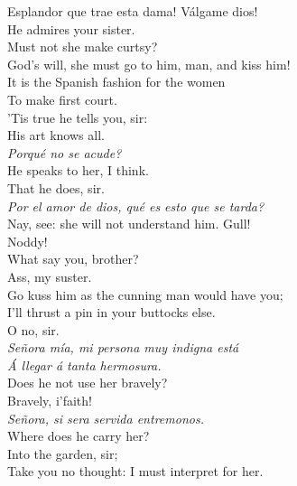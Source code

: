 \documentclass[a4paper,oneside,12pt]{memoir}
\begin{document}
\begin{drama*}
{Esplandor que trae esta dama! V\'{a}lgame dios!}\\
\facespeaks He admires your sister.\\
\kastrilspeaks {} Must not she make curtsy?\\
\subtlespeaks God's will, she must go to him, man, and kiss him!\\
It is the Spanish fashion for the women\\
To make first court.\\
\facespeaks {} 'Tis true he tells you, sir:\\
His art knows all.\\
\surlyspeaks {} \emph{Porqu\'{e} no se acude?}\\
\kastrilspeaks He speaks to her, I think.\\
\facespeaks {} That he does, sir.\\
\surlyspeaks \emph{Por el amor de dios, qu\'{e} es esto que se tarda?}\\
\kastrilspeaks Nay, see: she will not understand him. Gull!\\
Noddy!\\
\pliantspeaks {} What say you, brother?\\
\kastrilspeaks {} Ass, my suster.\\
Go kuss him as the cunning man would have you;\\
I'll thrust a pin in your buttocks else.\\
\facespeaks {} O no, sir.\\
\surlyspeaks \emph{Se\~{n}ora m\'{i}a, mi persona muy indigna est\'{a}\\
\'{A} llegar \'{a} tanta hermosura.}\\
\facespeaks Does he not use her bravely?\\
\kastrilspeaks {} Bravely, i'faith!\\
\surlyspeaks \emph{Se\~{n}ora, si sera servida entremonos.}\\
\kastrilspeaks Where does he carry her?\\
\facespeaks {} Into the garden, sir;\\
Take you no thought: I must interpret for her.\\

\end{drama*}
\end{document}

